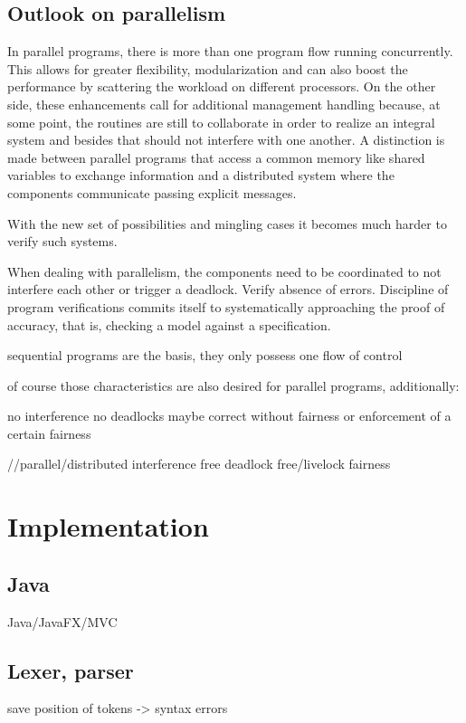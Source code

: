 \section{Outlook on parallelism}
In parallel programs, there is more than one program flow running concurrently. This allows for greater flexibility, modularization and can also boost the performance by scattering the workload on different processors. On the other side, these enhancements call for additional management handling because, at some point, the routines are still to collaborate in order to realize an integral system and besides that should not interfere with one another. A distinction is made between parallel programs that access a common memory like shared variables to exchange information and a distributed system where the components communicate passing explicit messages.

With the new set of possibilities and mingling cases it becomes much harder to verify such systems.

When dealing with parallelism, the components need to be coordinated
to not interfere each other or trigger a deadlock. Verify absence
of errors. Discipline of program verifications commits itself to systematically
approaching the proof of accuracy, that is, checking a model against
a specification.

sequential programs are the basis, they only possess one flow of control

of course those characteristics are also desired for parallel programs,
additionally:

no interference
no deadlocks
maybe correct without fairness or enforcement of a certain fairness

//parallel/distributed
interference free
deadlock free/livelock
fairness

\chapter{Implementation}

\section{Java}
Java/JavaFX/MVC

\section{Lexer, parser}

save position of tokens -> syntax errors

